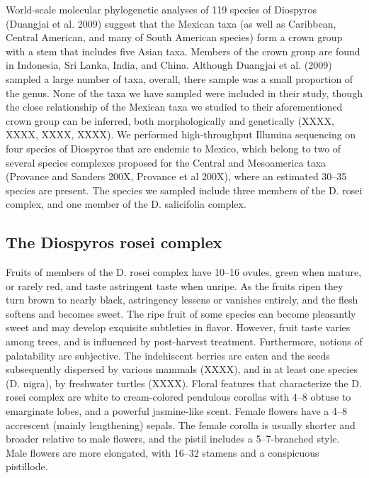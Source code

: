 \documentclass[]{article}
\begin{document}
World-scale molecular phylogenetic analyses of 119 species of Diospyros (Duangjai et al. 2009) suggest that the Mexican taxa (as well as Caribbean, Central American, and many of South American species) form a crown group with a stem that includes five Asian taxa. Members of the crown group are found in Indonesia, Sri Lanka, India, and China. Although Duangjai et al. (2009) sampled a large number of taxa, overall, there sample was a small proportion of the genus. None of the taxa we have sampled were included in their study, though the close relationship of the Mexican taxa we studied to their aforementioned crown group can be inferred, both morphologically and genetically (XXXX, XXXX, XXXX, XXXX). We performed high-throughput Illumina sequencing on four species of Diospyros that are endemic to Mexico, which belong to two of several species complexes proposed for the Central and Mesoamerica taxa (Provance and Sanders 200X, Provance et al 200X), where an estimated 30–35 species are present. The species we sampled include three members of the D. rosei complex, and one member of the D. salicifolia complex.
 
\subsection*{The Diospyros rosei complex}
Fruits of members of the D. rosei complex have 10–16 ovules, green when mature, or rarely red, and taste astringent taste when unripe. As the fruits ripen they turn brown to nearly black, astringency lessens or vanishes entirely, and the flesh softens and becomes sweet. The ripe fruit of some species can become pleasantly sweet and may develop exquisite subtleties in flavor. However, fruit taste varies among trees, and is influenced by post-harvest treatment. Furthermore, notions of palatability are subjective. The indehiscent berries are eaten and the seeds subsequently dispersed by various mammals (XXXX), and in at least one species (D. nigra), by freshwater turtles (XXXX). Floral features that characterize the D. rosei complex are white to cream-colored pendulous corollas with 4–8 obtuse to emarginate lobes, and a powerful jasmine-like scent. Female flowers have a 4–8 accrescent (mainly lengthening) sepals. The female corolla is usually shorter and broader relative to male flowers, and the pistil includes a 5–7-branched style. Male flowers are more elongated, with 16–32 stamens and a conspicuous pistillode.
\end{document}
